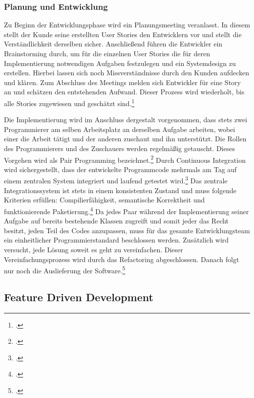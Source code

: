 \subsubsection{Planung und Entwicklung}
Zu Beginn der Entwicklungsphase wird ein Planungsmeeting veranlasst. In diesem stellt der Kunde seine erstellten User Stories den Entwicklern vor und stellt die Verständlichkeit derselben sicher. Anschließend führen die Entwickler ein Brainstorming durch, um für die einzelnen User Stories die für deren Implementierung notwendigen Aufgaben festzulegen und ein Systemdesign zu erstellen. Hierbei lassen sich noch Missverständnisse durch den Kunden aufdecken und klären. Zum Abschluss des Meetings melden sich Entwickler für eine Story an und schätzen den entstehenden Aufwand. Dieser Prozess wird wiederholt, bis alle Stories zugewiesen und geschätzt sind.\footcite[Vgl.][Seite 63 f.]{extreme}

Die Implementierung wird im Anschluss dergestalt vorgenommen, dass stets zwei Programmierer am selben Arbeitsplatz an derselben Aufgabe arbeiten, wobei einer die Arbeit tätigt und der anderen zuschaut und ihn unterstützt. Die Rollen des Programmierers und des Zuschauers werden regelmäßig getauscht. Dieses Vorgehen wird als Pair Programming bezeichnet.\footcite[Vgl.][Seite 72]{extreme} Durch Continuous Integration wird sichergestellt, dass der entwickelte Programmcode mehrmals am Tag auf einem zentralen System integriert und laufend getestet wird.\footcite[Vgl.][Seite 78]{extreme} Das zentrale Integrationssystem ist stets in einem konsistenten Zustand und muss folgende Kriterien erfüllen: Compilierfähigkeit, semantische Korrektheit und funktionierende Paketierung.\footcite[Vgl.][Seite 22]{pichler} Da jedes Paar während der Implementierung seiner Aufgabe auf bereits bestehende Klassen zugreift und somit jeder das Recht besitzt, jeden Teil des Codes anzupassen, muss für das gesamte Entwicklungsteam ein einheitlicher Programmierstandard beschlossen werden. Zusätzlich wird versucht, jede Lösung soweit es geht zu vereinfachen. Dieser Vereinfachungsprozess wird durch das Refactoring abgeschlossen. Danach folgt nur noch die Auslieferung der Software.\footcite[Vgl.][Seite 72 ff.]{extreme}

\subsection{Feature Driven Development}
